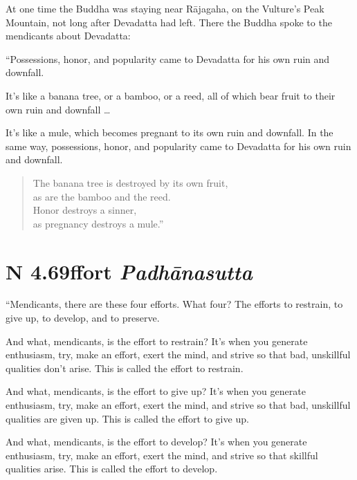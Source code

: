 \documentclass[12pt,openany]{book}%
\newcommand*{\suttatitleacronym}[1]{\smaller[2]{#1}\vspace*{.3em}}
\newcommand*{\suttatitletranslation}[1]{\linebreak{#1}}
\newcommand*{\suttatitleroot}[1]{\linebreak\smaller[2]\itshape{#1}}
\newcommand*{\tocacronym}[1]{\hspace*{-3.3em}{#1}\quad}
\newcommand*{\toctranslation}[1]{#1}
\newcommand*{\tocroot}[1]{(\textit{#1})}
\begin{document}
At one time the Buddha was staying near \textsanskrit{Rājagaha}, on the Vulture’s Peak Mountain, not long after Devadatta had left. There the Buddha spoke to the mendicants about Devadatta: 

“Possessions, honor, and popularity came to Devadatta for his own ruin and downfall. 

It’s like a banana tree, or a bamboo, or a reed, all of which bear fruit to their own ruin and downfall … 

It’s like a mule, which becomes pregnant to its own ruin and downfall. In the same way, possessions, honor, and popularity came to Devadatta for his own ruin and downfall. 

\begin{verse}%
The banana tree is destroyed by its own fruit, \\
as are the bamboo and the reed. \\
Honor destroys a sinner, \\
as pregnancy destroys a mule.” 

%
\end{verse}

%
\section*{{\suttatitleacronym AN 4.69}{\suttatitletranslation Effort }{\suttatitleroot Padhānasutta}}
\addcontentsline{toc}{section}{\tocacronym{AN 4.69} \toctranslation{Effort } \tocroot{Padhānasutta}}

“Mendicants, there are these four efforts. What four? The efforts to restrain, to give up, to develop, and to preserve. 

And what, mendicants, is the effort to restrain? It’s when you generate enthusiasm, try, make an effort, exert the mind, and strive so that bad, unskillful qualities don’t arise. This is called the effort to restrain. 

And what, mendicants, is the effort to give up? It’s when you generate enthusiasm, try, make an effort, exert the mind, and strive so that bad, unskillful qualities are given up. This is called the effort to give up. 

And what, mendicants, is the effort to develop? It’s when you generate enthusiasm, try, make an effort, exert the mind, and strive so that skillful qualities arise. This is called the effort to develop. 
\end{document}
